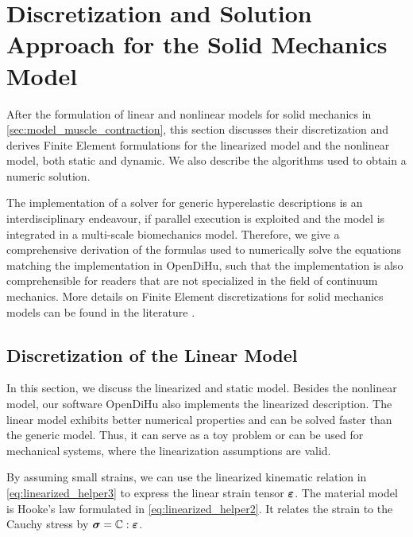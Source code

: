
\section{Discretization and Solution Approach for the Solid Mechanics Model}\label{sec:discretization_mechanics}

After the formulation of linear and nonlinear models for solid mechanics in \cref{sec:model_muscle_contraction}, this section discusses their discretization and derives Finite Element formulations for the linearized model and the nonlinear model, both static and dynamic.
We also describe the algorithms used to obtain a numeric solution.

The implementation of a solver for generic hyperelastic descriptions is an interdisciplinary endeavour, if parallel execution is exploited and the model is integrated in a multi-scale biomechanics model.
Therefore, we give a comprehensive derivation of the formulas used to numerically solve the equations matching the implementation in OpenDiHu, such that the implementation is also comprehensible for readers that are not specialized in the field of continuum mechanics. More details on Finite Element discretizations for solid mechanics models can be found in the literature \cite{zienkiewicz1977finite,SUSSMAN1987357,zienkiewicz2005finite}.

\subsection{Discretization of the Linear Model}\label{sec:linearized_mechanics_model}

In this section, we discuss the linearized and static model. Besides the nonlinear model, our software OpenDiHu also implements the linearized description. The linear model exhibits better numerical properties and can be solved faster than the generic model. Thus, it can serve as a toy problem or can be used for mechanical systems, where the linearization assumptions are valid.

By assuming small strains, we can use the linearized kinematic relation in \cref{eq:linearized_helper3} to express the linear strain tensor $\boldsymbol{\varepsilon}$. The material model is Hooke's law formulated in \cref{eq:linearized_helper2}. It relates the strain to the Cauchy stress by $\boldsymbol{\sigma} = \mathbb{C}:\boldsymbol{\varepsilon}$.


